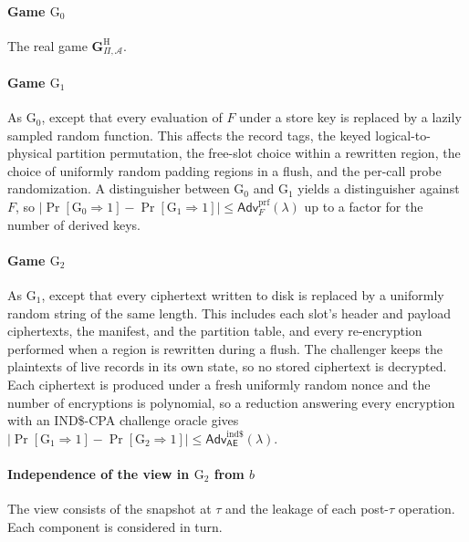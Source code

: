 \paragraph{Game $\mathrm{G}_0$} The real game $\mathbf{G}^{\mathrm{H}}_{\Pi,\mathcal{A}}$.

\paragraph{Game $\mathrm{G}_1$} As $\mathrm{G}_0$, except that every evaluation of $F$ under a
store key is replaced by a lazily sampled random function. This affects the record tags, the
keyed logical-to-physical partition permutation, the free-slot choice within a rewritten region,
the choice of uniformly random padding regions in a flush, and the per-call probe randomization.
A distinguisher between $\mathrm{G}_0$ and $\mathrm{G}_1$ yields a distinguisher against $F$, so
$|\Pr[\mathrm{G}_0 \Rightarrow 1] - \Pr[\mathrm{G}_1 \Rightarrow 1]| \le
\mathsf{Adv}^{\mathrm{prf}}_{F}(\lambda)$ up to a factor for the number of derived keys.

\paragraph{Game $\mathrm{G}_2$} As $\mathrm{G}_1$, except that every ciphertext written to disk is
replaced by a uniformly random string of the same length. This includes each slot's header and
payload ciphertexts, the manifest, and the partition table, and every re-encryption performed when
a region is rewritten during a flush. The challenger keeps the plaintexts of live records in its
own state, so no stored ciphertext is decrypted. Each ciphertext is produced under a fresh
uniformly random nonce and the number of encryptions is polynomial, so a reduction answering every
encryption with an IND\$-CPA challenge oracle gives
$|\Pr[\mathrm{G}_1 \Rightarrow 1] - \Pr[\mathrm{G}_2 \Rightarrow 1]| \le
\mathsf{Adv}^{\mathrm{ind\$}}_{\mathsf{AE}}(\lambda)$.

\paragraph{Independence of the view in $\mathrm{G}_2$ from $b$} The view consists of the snapshot
at $\tau$ and the leakage of each post-$\tau$ operation. Each component is considered in turn.

